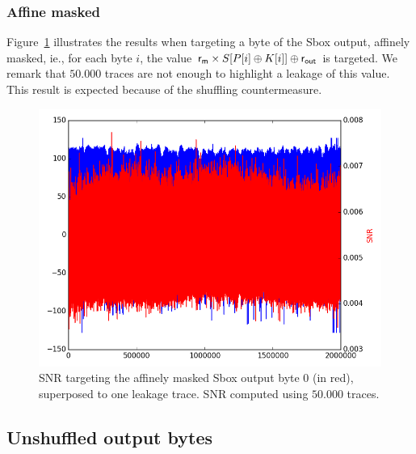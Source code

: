 \subsubsection{Affine masked}
Figure~\ref{fig:SNR_aS0+b} illustrates the results when targeting a byte of the Sbox output, affinely masked, ie., for each byte $i$, the value $\mathsf{r_m} \times S[P[i]\oplus K[i]] \oplus \mathsf{r_{out}}$ is targeted. We remark that $50.000$ traces are not enough to highlight a leakage of this value.
This result is expected because of the shuffling countermeasure.
\begin{figure}[H]
	\centering 
	\includegraphics[scale=0.35]{figures/2Mpts/SNR_raw_aS+b0_50ktraces.png}
	\caption{SNR targeting the affinely masked Sbox output byte 0 (in red), superposed to one leakage trace. SNR computed using $50.000$ traces.}
	\label{fig:SNR_aS0+b}
\end{figure}


\subsection{Unshuffled output bytes}
